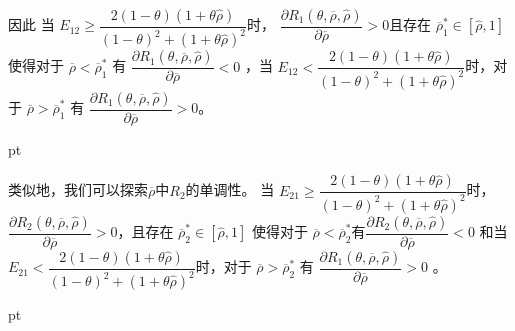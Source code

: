 \documentclass[10.0pt]{article}
\begin{document}
因此 当 {\footnotesize $ E_{1 2} \geqslant \dfrac{2 (1 - \theta) (1 + \theta \hat{\rho})}{(1 - \theta)^2 + (1 + \theta\hat{\rho})^2} $}时， {\footnotesize $ \dfrac{\partial R_1 (\theta, \overline{\rho}, {\hat \rho})}{\partial \overline{\rho}} > 0 $}且存在 {\footnotesize $ \overline{\rho}_1^* \in [{\hat \rho}, 1] $}  使得对于 {\footnotesize $ \overline{\rho} < \overline{\rho}_1^* $} 有 {\footnotesize $ \dfrac{\partial R_1 (\theta, \overline{\rho}, {\hat \rho})}{\partial \overline{\rho}} < 0 $}  ，当  {\footnotesize $ E_{1 2} < \dfrac{2 (1 - \theta) (1 + \theta \hat{\rho})}{(1 - \theta)^2 + (1 + \theta\hat{\rho})^2} $}时，对于 {\footnotesize $ \overline{\rho} > \overline{\rho}_1^* $} 有 {\footnotesize $ \dfrac{\partial R_1 (\theta, \overline{\rho}, {\hat \rho})}{\partial \overline{\rho}} > 0 $}。

 pt

类似地，我们可以探索$\overline{\rho}$中$R_2$的单调性。 当 {\footnotesize $ E_{ 2 1} \geqslant \dfrac{2 (1 - \theta) (1 + \theta \hat{\rho})}{(1 - \theta)^2 + (1 + \theta\hat{\rho}) ^2} $}时，{\footnotesize $ \dfrac{\partial R_2 (\theta, \overline{\rho}, {\hat \rho})}{\partial \overline{\rho}} > 0 $}，且存在 {\footnotesize $ \overline{\rho}_2^* \in [{\hat \rho}, 1] $} 使得对于 {\footnotesize $ \overline{\rho} < \overline{\rho}_2 ^* $}有{\footnotesize $ \dfrac{\partial R_2 (\theta, \overline{\rho}, {\hat \rho})}{\partial \overline{\rho}} < 0 $} 和当 {\footnotesize $ E_{2 1} < \dfrac{2 (1 - \theta) (1 + \theta \hat{ \rho})}{(1 - \theta)^2 + (1 + \theta\hat{\rho})^2} $}时，对于 { \footnotesize $ \overline{\rho} > \overline{\rho}_2^* $} 有 {\footnotesize $ \dfrac{\partial R_1 (\theta, \overline{\rho}, {\hat \rho})}{\partial \overline{\rho}} > 0 $}  。





 pt
\end{document}
